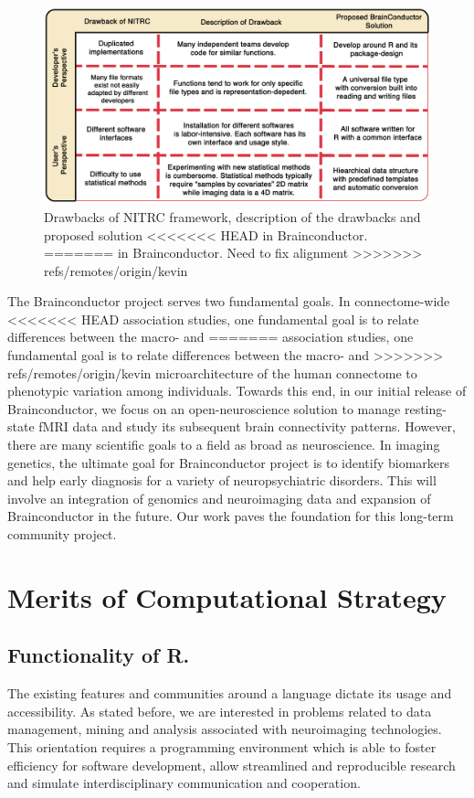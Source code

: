 \documentclass{nature}
\begin{document}
\begin{figure}[tb]
\centering
\includegraphics[width=400pt]{fig/brainconductor/brainconductor_nitrc_chart_v2.png}
\caption{Drawbacks of NITRC framework, description of the drawbacks and proposed
solution
<<<<<<< HEAD
in Brainconductor. %
=======
in Brainconductor. {\color{red}Need to fix alignment}
>>>>>>> refs/remotes/origin/kevin
}
\label{fig:nitrc}
\end{figure}


The Brainconductor project serves two fundamental goals. In connectome-wide
<<<<<<< HEAD
association studies, one fundamental goal is to relate differences between the macro- and
=======
association studies, one fundamental goal is to relate differences between the
macro- and
>>>>>>> refs/remotes/origin/kevin
microarchitecture of the human connectome to phenotypic variation among
individuals\cite{milham2012open}. Towards this end,
in our
initial release of Brainconductor, we focus on an open-neuroscience
solution to manage resting-state fMRI data and study its
subsequent brain connectivity patterns.
However, there are many scientific goals to a field as broad as neuroscience.
In imaging genetics, the ultimate goal
for Brainconductor project is to identify biomarkers and help early diagnosis
for a variety of neuropsychiatric disorders. This will involve an
integration of genomics and neuroimaging data and expansion of Brainconductor
in the future. Our work paves the foundation for this long-term community 
project.


\section{Merits of Computational Strategy}

\subsection{Functionality of R.}
The existing features and communities around a language dictate
its usage and accessibility. As stated before, we are
interested in problems related to data management, mining and analysis
associated with neuroimaging technologies. This orientation requires
a programming environment which is able to foster
efficiency for software development, allow
streamlined and reproducible research and simulate
interdisciplinary communication and cooperation.
\end{document}
